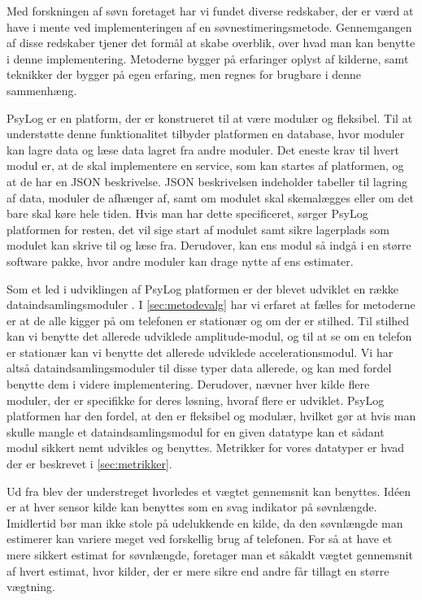 Med forskningen af søvn foretaget har vi fundet diverse redskaber, der er værd at have i mente ved implementeringen af en søvnestimeringsmetode.
Gennemgangen af disse redskaber tjener det formål at skabe overblik, over hvad man kan benytte i denne implementering.
Metoderne bygger på erfaringer oplyst af kilderne, samt teknikker der bygger på egen erfaring, men regnes for brugbare i denne sammenhæng.

\begin{description}[style=nextline]
\item[PsyLog]
PsyLog er en platform, der er konstrueret til at være modulær og fleksibel.
Til at understøtte denne funktionalitet tilbyder platformen en database, hvor moduler kan lagre data og læse data lagret fra andre moduler.
Det eneste krav til hvert modul er, at de skal implementere en service, som kan startes af platformen, og at de har en JSON beskrivelse.
JSON beskrivelsen indeholder tabeller til lagring af data, moduler de afhænger af, samt om modulet skal skemalægges eller om det bare skal køre hele tiden.
Hvis man har dette specificeret, sørger PsyLog platformen for resten, det vil sige start af modulet samt sikre lagerplads som modulet kan skrive til og læse fra.
Derudover, kan ens modul så indgå i en større software pakke, hvor andre moduler kan drage nytte af ens estimater.

\item[Dataindsamlingsmoduler]
Som et led i udviklingen af PsyLog platformen er der blevet udviklet en række dataindsamlingsmoduler \citep{misc:faellesrapp}.
I \cref{sec:metodevalg} har vi erfaret at fælles for metoderne er at de alle kigger på om telefonen er stationær og om der er stilhed. 
Til stilhed kan vi benytte det allerede udviklede amplitude-modul, og til at se om en telefon er stationær kan vi benytte det allerede udviklede accelerationsmodul.
Vi har altså dataindsamlingsmoduler til disse typer data allerede, og kan med fordel benytte dem i videre implementering.
Derudover, nævner hver kilde flere moduler, der er specifikke for deres løsning, hvoraf flere er udviklet.
PsyLog platformen har den fordel, at den er fleksibel og modulær, hvilket gør at hvis man skulle mangle et dataindsamlingsmodul for en given datatype kan et sådant modul sikkert nemt udvikles og benyttes.
Metrikker for vores datatyper er hvad der er beskrevet i \cref{sec:metrikker}.

\item[Vægtet gennemsnit]
Ud fra \citet{6563918} blev der understreget hvorledes et vægtet gennemsnit kan benyttes.
Idéen er at hver sensor kilde kan benyttes som en svag indikator på søvnlængde.
Imidlertid bør man ikke stole på udelukkende en kilde, da den søvnlængde man estimerer kan variere meget ved forskellig brug af telefonen.
For så at have et mere sikkert estimat for søvnlængde, foretager man et såkaldt vægtet gennemsnit af hvert estimat, hvor kilder, der er mere sikre end andre får tillagt en større vægtning.


\end{description}
